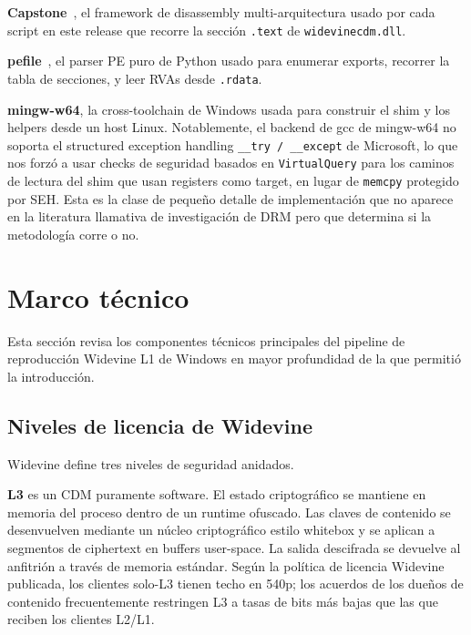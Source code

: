 \documentclass[11pt,letterpaper]{article}
\let\oldsection\section
\renewcommand{\section}{\clearpage\oldsection}
\begin{document}
\textbf{Capstone}~\cite{capstone-tool}, el framework de
disassembly multi-arquitectura usado por cada script en este
release que recorre la sección \texttt{.text} de
\texttt{widevinecdm.dll}.

\textbf{pefile}~\cite{pefile-tool}, el parser PE puro de Python
usado para enumerar exports, recorrer la tabla de secciones, y
leer RVAs desde \texttt{.rdata}.

\textbf{mingw-w64}, la cross-toolchain de Windows usada para
construir el shim y los helpers desde un host Linux. Notablemente,
el backend de gcc de mingw-w64 no soporta el structured exception
handling \texttt{\_\_try / \_\_except} de Microsoft, lo que nos
forzó a usar checks de seguridad basados en \texttt{VirtualQuery}
para los caminos de lectura del shim que usan registers como
target, en lugar de \texttt{memcpy} protegido por SEH. Esta es la
clase de pequeño detalle de implementación que no aparece en la
literatura llamativa de investigación de DRM pero que determina
si la metodología corre o no.

\section{Marco técnico}
\label{sec:background}

Esta sección revisa los componentes técnicos principales del
pipeline de reproducción Widevine L1 de Windows en mayor
profundidad de la que permitió la introducción.

\subsection{Niveles de licencia de Widevine}
\label{sec:bg-levels}

Widevine define tres niveles de seguridad anidados.

\textbf{L3} es un CDM puramente software. El estado criptográfico
se mantiene en memoria del proceso dentro de un runtime ofuscado.
Las claves de contenido se desenvuelven mediante un núcleo
criptográfico estilo whitebox y se aplican a segmentos de
ciphertext en buffers user-space. La salida descifrada se devuelve
al anfitrión a través de memoria estándar. Según la política de
licencia Widevine publicada, los clientes solo-L3 tienen techo en
540p; los acuerdos de los dueños de contenido frecuentemente
restringen L3 a tasas de bits más bajas que las que reciben los
clientes L2/L1.
\end{document}
